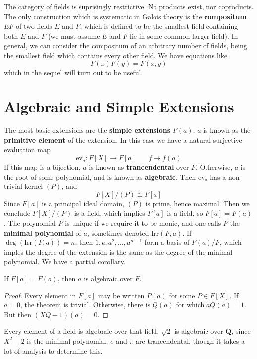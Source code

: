 The category of fields is suprisingly restrictive. No products exist, nor coproducts. The only construction which is systematic in Galois theory is the {\bf compositum} $EF$ of two fields $E$ and $F$, which is defined to be the smallest field containing both $E$ and $F$ (we must assume $E$ and $F$ lie in some common larger field). In general, we can consider the compositum of an arbitrary number of fields, being the smallest field which contains every other field. We have equations like
%
\[ F(x)F(y) = F(x,y) \]
%
which in the sequel will turn out to be useful.

\section{Algebraic and Simple Extensions}

The most basic extensions are the {\bf simple extensions} $F(a)$. $a$ is known as the {\bf primitive element} of the extension. In this case we have a natural surjective evaluation map
%
\[ \text{ev}_a: F[X] \to F[a]\ \ \ \ \ \ \ \ f \mapsto f(a) \]
%
If this map is a bijection, $a$ is known as {\bf trancendental} over $F$. Otherwise, $a$ is the root of some polynomial, and is known as {\bf algebraic}. Then $\text{ev}_a$ has a non-trivial kernel $(P)$, and
%
\[ F[X]/(P) \cong F[a] \]
%
Since $F[a]$ is a principal ideal domain, $(P)$ is prime, hence maximal. Then we conclude $F[X]/(P)$ is a field, which implies $F[a]$ is a field, so $F[a] = F(a)$. The polynomial $P$ is unique if we require it to be monic, and one calls $P$ the {\bf minimal polynomial} of $a$, sometimes denoted $\text{Irr}(F,a)$. If $\deg(\text{Irr}(F,a)) = n$, then $1, a, a^2, \dots, a^{n-1}$ form a basis of $F(a)/F$, which imples the degree of the extension is the same as the degree of the minimal polynomial. We have a partial corollary.

\begin{lemma}
    If $F[a] = F(a)$, then $a$ is algebraic over $F$.
\end{lemma}
\begin{proof}
    Every element in $F[a]$ may be written $P(a)$ for some $P \in F[X]$. If $a = 0$, the theorem is trivial. Otherwise, there is $Q(a)$ for which $aQ(a) = 1$. But then $(XQ - 1)(a) = 0$.
\end{proof}

\begin{example}
    Every element of a field is algebraic over that field. $\sqrt{2}$ is algebraic over $\mathbf{Q}$, since $X^2 - 2$ is the minimal polynomial. $e$ and $\pi$ are trancendental, though it takes a lot of analysis to determine this.
\end{example}

